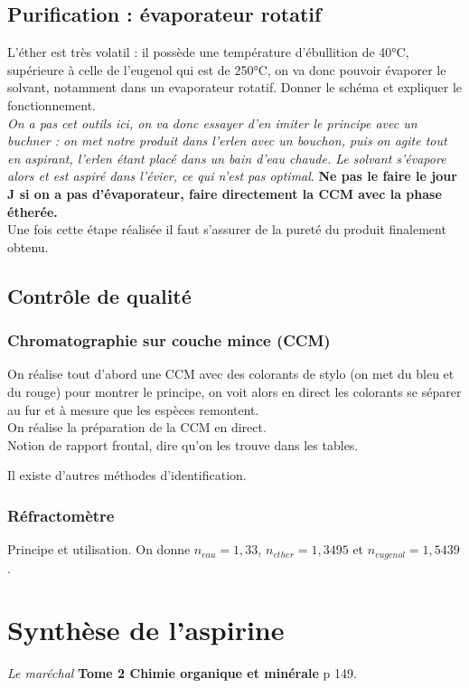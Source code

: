 \documentclass[12pt,prb,aps,epsf]{article}
\begin{document}
\subsection{Purification : évaporateur rotatif}
L'éther est très volatil : il possède une température d'ébullition de 40°C, supérieure à celle de l'eugenol qui est de 250°C, on va donc pouvoir évaporer le solvant, notamment dans un evaporateur rotatif. Donner le schéma et expliquer le fonctionnement.\\
\textit{On a pas cet outils ici, on va donc essayer d'en imiter le principe avec un buchner : on met notre produit dans l'erlen avec un bouchon, puis on agite tout en aspirant, l'erlen étant placé dans un bain d'eau chaude. Le solvant s'évapore alors et est aspiré dans l'évier, ce qui n'est pas optimal}. \textbf{Ne pas le faire le jour J si on a pas d'évaporateur, faire directement la CCM avec la phase étherée.}\\

Une fois cette étape réalisée il faut s'assurer de la pureté du produit finalement obtenu.

\subsection{Contrôle de qualité}
\subsubsection{Chromatographie sur couche mince (CCM)}
On réalise tout d'abord une CCM avec des colorants de stylo (on met du bleu et du rouge) pour montrer le principe, on voit alors en direct les colorants se séparer au fur et à mesure que les espèces remontent.\\
On réalise la préparation de la CCM en direct.\\
Notion de rapport frontal, dire qu'on les trouve dans les tables.

Il existe d'autres méthodes d'identification.

\subsubsection{Réfractomètre}
Principe et utilisation. On donne $n_{eau} = 1,33$, $n_{ether} = 1,3495$ et $n_{eugenol} = 1,5439$.

\section{Synthèse de l'aspirine}
\textit{Le maréchal} \textbf{Tome 2 Chimie organique et minérale} p 149.\\
\end{document}
